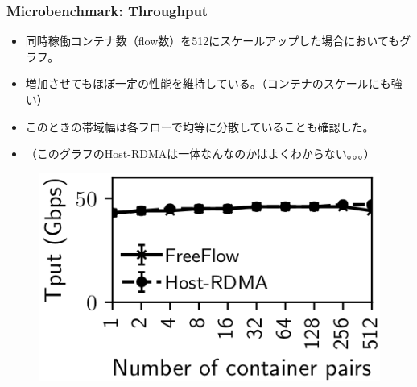 \documentclass[dvipdfmx,9pt,notheorems]{beamer}
\theoremstyle{definition}
\begin{document}
\begin{frame}\frametitle{Microbenchmark: Throughput}
	\begin{itemize}
			\item 同時稼働コンテナ数（flow数）を512にスケールアップした場合においてもグラフ。
			\item 増加させてもほぼ一定の性能を維持している。（コンテナのスケールにも強い）
			\item このときの帯域幅は各フローで均等に分散していることも確認した。
			\item （このグラフのHost-RDMAは一体なんなのかはよくわからない。。。）
	\end{itemize}
  \begin{figure}[htb]
    \centering
		\includegraphics[scale=1]{fig/figure11.png}
  \end{figure}
\end{frame}
\end{document}

